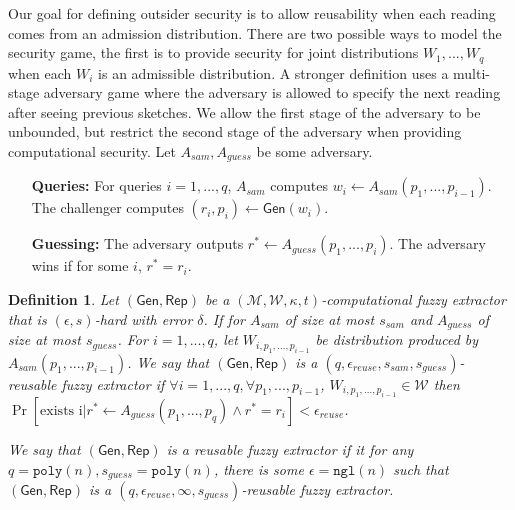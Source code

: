 \documentclass[11pt]{article}
\newcommand{\class}[1]{{\ensuremath{\mathsf{#1}}}}
\newcommand{\gen}{\ensuremath{\class{Gen}}\xspace}
\newcommand{\rep}{\ensuremath{\class{Rep}}\xspace}
\newcommand{\poly}{\ensuremath{\mathtt{poly}}\xspace}
\newcommand{\ngl}{\ensuremath{\mathtt{ngl}}\xspace}
\newtheorem{definition}[theorem]{Definition}
\begin{document}
Our goal for defining outsider security is to allow reusability when each reading comes from an admission distribution.  There are two possible ways to model the security game, the first is to provide security for joint distributions $W_1,..., W_q$ when each $W_i$ is an admissible distribution.  A stronger definition uses a multi-stage adversary game where the adversary is allowed to specify the next reading after seeing previous sketches.  We allow the first stage of the adversary to be unbounded, but restrict the second stage of the adversary when providing computational security.  Let $A_{sam}, A_{guess}$ be some adversary.

\begin{enumerate}
\item[\textbf{Queries:}] For queries $i=1,..., q$, $A_{sam}$ computes $w_i\leftarrow A_{sam}(p_1,..., p_{i-1})$.  The challenger computes $(r_i, p_i)\leftarrow \gen(w_i)$.
\item[\textbf{Guessing:}] The adversary outputs $r^*\leftarrow A_{guess}(p_1,..., p_i)$.  The adversary wins if for some $i$, $r^* = r_i$.
\end{enumerate}

\begin{definition}
Let $(\gen, \rep)$ be a $(\mathcal{M}, \mathcal{W}, \kappa, t)$-computational fuzzy extractor that is $(\epsilon, s)$-hard with error $\delta$.  If for $A_{sam}$ of size at most $s_{sam}$ and $A_{guess}$ of size at most $s_{guess}$.  For $i=1,..., q$, let $W_{i, p_1,..., p_{i-1}}$ be distribution produced by $A_{sam}(p_1,..., p_{i-1})$.  We say that $(\gen, \rep)$ is a $(q, \epsilon_{reuse}, s_{sam}, s_{guess})$-reusable fuzzy extractor if $\forall i=1,..., q, \forall p_1,..., p_{i-1}$, $W_{i, p_1,..., p_{i-1}}\in\mathcal{W}$ then $\Pr[\text{exists i}| r^*\leftarrow A_{guess}(p_1,..., p_q) \wedge r^* = r_i] <\epsilon_{reuse}$.  

We say that $(\gen, \rep)$ is a reusable fuzzy extractor if it for any $q = \poly(n), s_{guess} = \poly(n)$, there is some $\epsilon = \ngl(n)$ such that $(\gen, \rep)$ is a $(q, \epsilon_{reuse}, \infty, s_{guess})$-reusable fuzzy extractor.
\end{definition}
\end{document}
